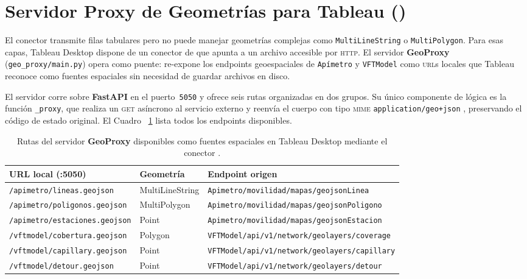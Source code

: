 
\section{Servidor Proxy de Geometrías para Tableau ()}
\label{anx:tg-geoproxy}

El conector  transmite filas tabulares pero no puede manejar
geometrías complejas como \texttt{MultiLineString} o \texttt{MultiPolygon}. Para
esas capas, Tableau Desktop dispone de un conector de  que
apunta a un archivo \geojson{} accesible por \textsc{http}. El servidor
\textbf{GeoProxy} (\texttt{geo\_proxy/main.py}) opera como puente: re-expone los
endpoints geoespaciales de \texttt{Apímetro} y \texttt{VFTModel} como
\textsc{url}s locales que Tableau reconoce como fuentes espaciales sin necesidad
de guardar archivos en disco.

El servidor corre sobre \textbf{FastAPI} en el puerto~\texttt{5050} y ofrece
seis rutas organizadas en dos grupos. Su único componente de lógica es la
función \texttt{\_proxy}, que realiza un \textsc{get} asíncrono al servicio
externo y reenvía el cuerpo con tipo \textsc{mime}
\texttt{application/geo+json} , preservando el código de estado original. El
Cuadro~ \ref{tab:tg-geoproxy-endpoints} lista todos los endpoints disponibles.

\begin{table}[htbp]
    \centering
    \footnotesize
    \caption[Endpoints del  para Tableau Spatial File]{Rutas
    del servidor \textbf{GeoProxy} disponibles como fuentes espaciales
    en Tableau Desktop mediante el conector .}
    \label{tab:tg-geoproxy-endpoints}
    \begin{tabularx}{\textwidth}{|l|l|>{\raggedright\arraybackslash}X|}
        \hline
        \textbf{URL local (:5050)} & \textbf{Geometría} & \textbf{Endpoint origen} \\
        \hline
        \texttt{/apimetro/lineas.geojson}     & MultiLineString & \nolinkurl{Apimetro/movilidad/mapas/geojsonLinea} \\
        \texttt{/apimetro/poligonos.geojson}  & MultiPolygon    & \nolinkurl{Apimetro/movilidad/mapas/geojsonPoligono} \\
        \texttt{/apimetro/estaciones.geojson} & Point           & \nolinkurl{Apimetro/movilidad/mapas/geojsonEstacion} \\
        \texttt{/vftmodel/cobertura.geojson}  & Polygon         & \nolinkurl{VFTModel/api/v1/network/geolayers/coverage} \\
        \texttt{/vftmodel/capillary.geojson}  & Point           & \nolinkurl{VFTModel/api/v1/network/geolayers/capillary} \\
        \texttt{/vftmodel/detour.geojson}     & Point           & \nolinkurl{VFTModel/api/v1/network/geolayers/detour} \\
        \hline
    \end{tabularx}
\end{table}

